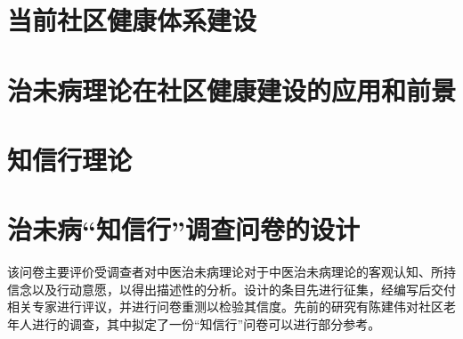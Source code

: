\section{当前社区健康体系建设}
\section{治未病理论在社区健康建设的应用和前景}
\section{知信行理论}
\section{治未病“知信行”调查问卷的设计}
该问卷主要评价受调查者对中医治未病理论对于中医治未病理论的客观认知、所持信念以及行动意愿，以得出描述性的分析。设计的条目先进行征集，经编写后交付相关专家进行评议，并进行问卷重测以检验其信度。先前的研究有陈建伟对社区老年人进行的调查\cite{cjw_1_2009}，其中拟定了一份“知信行”问卷可以进行部分参考。

